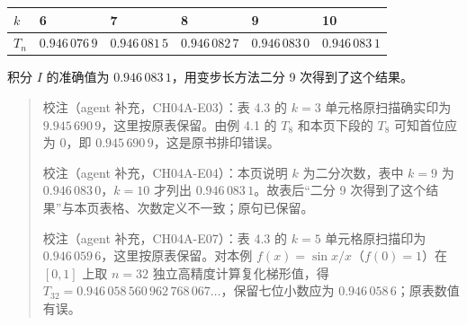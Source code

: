 {\def\LTcaptype{none} %
\begin{longtable}[]{@{}
  >{\raggedright\arraybackslash}p{}
  >{\raggedright\arraybackslash}p{}
  >{\raggedright\arraybackslash}p{}
  >{\raggedright\arraybackslash}p{}
  >{\raggedright\arraybackslash}p{}
  >{\raggedright\arraybackslash}p{}@{}}
\toprule\noalign{}
\begin{minipage}[b]{\linewidth}\raggedright
\(k\)
\end{minipage} & \begin{minipage}[b]{\linewidth}\raggedright
6
\end{minipage} & \begin{minipage}[b]{\linewidth}\raggedright
7
\end{minipage} & \begin{minipage}[b]{\linewidth}\raggedright
8
\end{minipage} & \begin{minipage}[b]{\linewidth}\raggedright
9
\end{minipage} & \begin{minipage}[b]{\linewidth}\raggedright
10
\end{minipage} \\
\midrule\noalign{}
\endhead
\bottomrule\noalign{}
\endlastfoot
\(T_n\) & \(0.946\,076\,9\) & \(0.946\,081\,5\) & \(0.946\,082\,7\) & \(0.946\,083\,0\) & \(0.946\,083\,1\) \\
\end{longtable}
}

积分 \(I\) 的准确值为 \(0.946\,083\,1\)，用变步长方法二分 9 次得到了这个结果。

\begin{quote}
校注（agent 补充，CH04A-E03）：表 4.3 的 \(k=3\) 单元格原扫描确实印为 \(9.945\,690\,9\)，这里按原表保留。由例 4.1 的 \(T_8\) 和本页下段的 \(T_8\) 可知首位应为 \(0\)，即 \(0.945\,690\,9\)，这是原书排印错误。

校注（agent 补充，CH04A-E04）：本页说明 \(k\) 为二分次数，表中 \(k=9\) 为 \(0.946\,083\,0\)，\(k=10\) 才列出 \(0.946\,083\,1\)。故表后``二分 9 次得到了这个结果''与本页表格、次数定义不一致；原句已保留。

校注（agent 补充，CH04A-E07）：表 4.3 的 \(k=5\) 单元格原扫描印为 \(0.946\,059\,6\)，这里按原表保留。对本例 \(f(x)=\sin x/x\)（\(f(0)=1\)）在 \([0,1]\) 上取 \(n=32\) 独立高精度计算复化梯形值，得 \(T_{32}=0.946\,058\,560\,962\,768\,067\ldots\)，保留七位小数应为 \(0.946\,058\,6\)；原表数值有误。
\end{quote}

